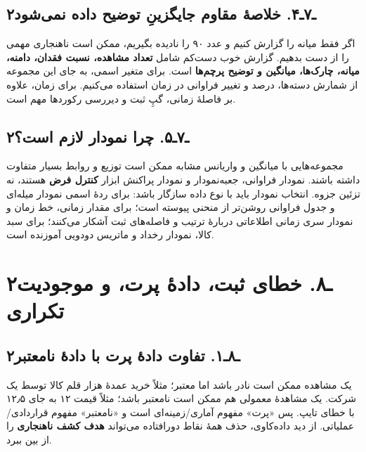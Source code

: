 \documentclass[12pt,a4paper,oneside]{book}
\begin{document}
\subsection{۲ـ۷ـ۴. خلاصهٔ مقاوم جایگزینِ توضیح داده نمی‌شود}\label{ux640ux6f7ux640ux6f4.-ux62eux644ux627ux635ux647-ux645ux642ux627ux648ux645-ux62cux627ux6ccux6afux632ux6ccux646-ux62aux648ux636ux6ccux62d-ux62fux627ux62fux647-ux646ux645ux6ccux634ux648ux62f}

اگر فقط میانه را گزارش کنیم و عدد ۹۰ را نادیده بگیریم، ممکن است ناهنجاری مهمی را از دست بدهیم. گزارش خوب دست‌کم شامل \textbf{تعداد مشاهده، نسبت فقدان، دامنه، میانه، چارک‌ها، میانگین و توضیح پرچم‌ها} است. برای متغیر اسمی، به جای این مجموعه از شمارش دسته‌ها، درصد و تغییر فراوانی در زمان استفاده می‌کنیم. برای زمان، علاوه بر فاصلهٔ زمانی، گپِ ثبت و دیررسی رکوردها مهم است.

\subsection{۲ـ۷ـ۵. چرا نمودار لازم است؟}\label{ux640ux6f7ux640ux6f5.-ux686ux631ux627-ux646ux645ux648ux62fux627ux631-ux644ux627ux632ux645-ux627ux633ux62a}

مجموعه‌هایی با میانگین و واریانس مشابه ممکن است توزیع و روابط بسیار متفاوت داشته باشند. نمودار فراوانی، جعبه‌نمودار و نمودار پراکنش ابزار \textbf{کنترل فرض} هستند، نه تزئین جزوه. انتخاب نمودار باید با نوع داده سازگار باشد: برای ردهٔ اسمی نمودار میله‌ای و جدول فراوانی روشن‌تر از منحنی پیوسته است؛ برای مقدار زمانی، خط زمان و نمودار سری زمانی اطلاعاتی دربارهٔ ترتیب و فاصله‌های ثبت آشکار می‌کنند؛ برای سبد کالا، نمودار رخداد و ماتریس دودویی آموزنده است.

\section{۲ـ۸. خطای ثبت، دادهٔ پرت، و موجودیت تکراری}\label{ux640ux6f8.-ux62eux637ux627ux6cc-ux62bux628ux62a-ux62fux627ux62fux647-ux67eux631ux62a-ux648-ux645ux648ux62cux648ux62fux6ccux62a-ux62aux6a9ux631ux627ux631ux6cc}

\subsection{۲ـ۸ـ۱. تفاوت دادهٔ پرت با دادهٔ نامعتبر}\label{ux640ux6f8ux640ux6f1.-ux62aux641ux627ux648ux62a-ux62fux627ux62fux647-ux67eux631ux62a-ux628ux627-ux62fux627ux62fux647-ux646ux627ux645ux639ux62aux628ux631}

یک مشاهده ممکن است نادر باشد اما معتبر؛ مثلاً خرید عمدهٔ هزار قلم کالا توسط یک شرکت. یک مشاهدهٔ معمولی هم ممکن است نامعتبر باشد؛ مثلاً قیمت ۱۲ به جای ۱۲٫۵ با خطای تایپ. پس «پرت» مفهوم آماری/زمینه‌ای است و «نامعتبر» مفهوم قراردادی/عملیاتی. از دید داده‌کاوی، حذف همهٔ نقاط دورافتاده می‌تواند \textbf{هدف کشف ناهنجاری} را از بین ببرد.
\end{document}
